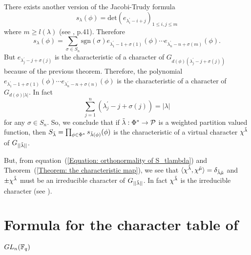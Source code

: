 There exists another version of the Jacobi-Trudy formula 
\begin{equation}
    s_\lambda(\phi) = \text{det}(e_{\lambda_i^\prime-i+j})_{1\leq i,j\leq m}
\end{equation}
where $m\geq l(\lambda)$ (see \cite{macdonald1998symmetric}, p.41). Therefore
\begin{equation}
    s_\lambda(\phi) = \sum_{\sigma\in S_n}\text{sgn}(\sigma) e_{\lambda_1^\prime-1+\sigma(1)}(\phi)\cdots e_{\lambda_n^\prime-n+\sigma(m)}(\phi).
\end{equation}
But $e_{\lambda^\prime_j-j+\sigma(j)}$ is the characteristic of a character of $G_{d(\phi)(\lambda^\prime_j-j+\sigma(j))}$ because of the previous theorem. Therefore, the polynomial $e_{\lambda_1^\prime-1+\sigma(1)}(\phi)\cdots e_{\lambda_n^\prime-n+\sigma(n)}(\phi)$ is the characteristic of a character of $G_{d(\phi)|\lambda|}$. In fact
\begin{equation}
    \sum_{j=1}^n(\lambda_j^\prime-j+\sigma(j))= |\lambda|
\end{equation}
for any $\sigma\in S_n$. So, we conclude that if $\Tilde{\lambda}:\Phi^*\rightarrow\mathcal{P}$ is a weighted partition valued function, then $S_{\Tilde{\lambda}}=\prod_{\phi\in\Phi^*}s_{\Tilde{\lambda}(\phi)}(\phi)$ is the characteristic of a virtual character $\chi^{\Tilde{\lambda}}$ of $ G_{||\Tilde{\lambda}||}$.\par
But, from equation~(\ref{Equation: orthonormality of S_tlambda}) and Theorem~(\ref{Theorem: the characteristic map}), we see that $\langle\chi^{\Tilde{\lambda}},\chi^{\Tilde{\mu}} \rangle=\delta_{\Tilde{\lambda}\Tilde{\mu}}$ and $\pm \chi^{\Tilde{\lambda}}$ must be an irreducible character of $G_{||\Tilde{\lambda}||}$. In fact $\chi^{\Tilde{\lambda}}$ is the irreducible character (see \cite{jing2024characters}).

\section{\texorpdfstring{Formula for the character table of $GL_n(\mathbb{F}_q)$}{Formula for the character table of GLn(Fq)}}

